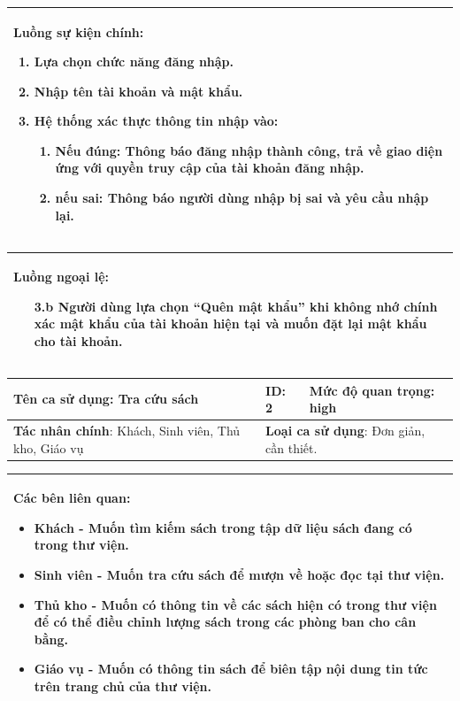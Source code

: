 \documentclass[../report.tex]{subfiles}
\begin{document}
\begin{center}
\begin{tabular}{| m{15.9cm} |}
    \hline
    \textbf{Luồng sự kiện chính}:
    \begin{enumerate}
        \item Lựa chọn chức năng đăng nhập. 
        \item Nhập tên tài khoản và mật khẩu. 
        \item Hệ thống xác thực thông tin nhập vào: 
        \begin{enumerate}
            \item Nếu đúng: Thông báo đăng nhập thành công, trả về giao diện ứng với quyền truy cập của tài khoản đăng nhập. 
            \item nếu sai: Thông báo người dùng nhập bị sai và yêu cầu nhập lại. 
        \end{enumerate}
    \end{enumerate} \\
    \hline
\end{tabular}

\begin{tabular}{| m{15.9cm} |}
    \hline
    \textbf{Luồng ngoại lệ}:
    \begin{enumerate}
        \item[3.b] Người dùng lựa chọn ``Quên mật khẩu'' khi không nhớ chính xác mật khẩu của tài khoản hiện tại và muốn đặt lại mật khẩu cho tài khoản. 
    \end{enumerate} \\
    \hline
\end{tabular}

\newpage
\begin{tabular}{| m{6cm} | m{3cm} | m{6cm} |}
    \hline
    \textbf{Tên ca sử dụng}: Tra cứu sách & \textbf{ID}: 2 & \textbf{Mức độ quan trọng}: high \\
    \hline
    \textbf{Tác nhân chính}: Khách, Sinh viên, Thủ kho, Giáo vụ & \multicolumn{2}{|l|}{\textbf{Loại ca sử dụng}: Đơn giản, cần thiết.} \\
    \hline
\end{tabular}
\begin{tabular}{| m{15.9cm} |}
    \hline
        \textbf{Các bên liên quan:} 
        \begin{itemize}
            \item Khách - Muốn tìm kiếm sách trong tập dữ liệu sách đang có trong thư viện. 
            \item Sinh viên - Muốn tra cứu sách để mượn về hoặc đọc tại thư viện. 
            \item Thủ kho - Muốn có thông tin về các sách hiện có trong thư viện để có thể điều chỉnh lượng sách trong các phòng ban cho cân bằng. 
            \item Giáo vụ - Muốn có thông tin sách để biên tập nội dung tin tức trên trang chủ của thư viện. 
        \end{itemize} \\
    \hline
\end{tabular}


\end{center}
\end{document}

